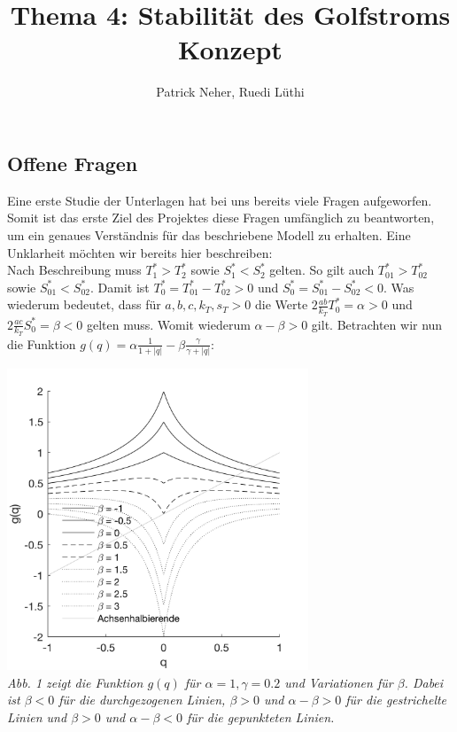 \documentclass[11pt,a4paper]{article}
\author{Patrick Neher, Ruedi Lüthi}
\title{Thema 4: Stabilität des Golfstroms \\ \textbf{Konzept} }
\begin{document}
	\maketitle

	\subsection*{Offene Fragen}

	Eine erste Studie der Unterlagen hat bei uns bereits viele Fragen aufgeworfen. Somit ist das erste Ziel des Projektes diese Fragen umfänglich zu beantworten, um ein genaues Verständnis für das beschriebene Modell zu erhalten. Eine Unklarheit möchten wir bereits hier beschreiben:\\
	
	Nach Beschreibung muss \(T^*_1 > T^*_2\) sowie \(S^*_1 < S^*_2\) gelten. So gilt auch \(T^*_{01} > T^*_{02}\) sowie \(S^*_{01} < S^*_{02}\). Damit ist \(T^*_0 = T^*_{01} - T^*_{02} > 0\) und \(S^*_0 = S^*_{01} - S^*_{02} < 0\). Was wiederum bedeutet, dass für \(a, b, c, k_T, s_T > 0\) die Werte \(2\frac{ab}{k_T}T^*_0 = \alpha > 0\) und  \(2\frac{ac}{k_T}S^*_0 = \beta < 0\) gelten muss. Womit wiederum \(\alpha - \beta > 0\) gilt. Betrachten wir nun die Funktion \(g(q) = \alpha \frac{1}{1+|q|} - \beta \frac{\gamma}{\gamma + |q|} \):

	\begin{center}
	\includegraphics[width=9cm]{Diagramme/g_von_q.png} \\
	\textit{Abb. 1 zeigt die Funktion \(g(q)\) für \(\alpha = 1, \gamma = 0.2\) und Variationen für \(\beta\). Dabei ist \(\beta < 0\) für die durchgezogenen Linien, \(\beta > 0\) und \(\alpha - \beta > 0\) für die gestrichelte Linien und \(\beta > 0\) und \(\alpha - \beta < 0\) für die gepunkteten Linien.}
	\end{center}
	
\end{document}
